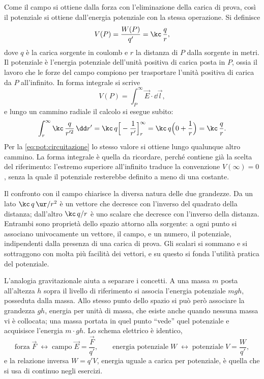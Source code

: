 \documentclass[main.tex]{subfiles}
\begin{document}
	Come il campo si ottiene dalla forza con l'eliminazione della carica di prova, così il potenziale si ottiene dall'energia potenziale con la stessa operazione. Si definisce
	\begin{equation}\label{eq:pot:Vpuntiforme}
		V(P)=\frac{W(P)}{q'}=\kc\,\frac{q}{r},
	\end{equation}
	dove $q$ è la carica sorgente in coulomb e $r$ la distanza di $P$ dalla sorgente in metri. Il potenziale è l'energia potenziale dell'unità positiva di carica posta in $P$, ossia il lavoro che le forze del campo compiono per trasportare l'unità positiva di carica da $P$ all'infinito. In forma integrale si scrive
	\[
	V(P)=\int_P^{\infty}\vec E\cdot\dd\vec l ,
	\]
	e lungo un cammino radiale il calcolo si esegue subito:
	\[
	\int_r^\infty\kc\,\frac{q}{r'^2}\,\dd r'=\kc\,q\Big[-\frac1{r'}\Big]_r^\infty=\kc\,q\Big(0+\frac1r\Big)=\kc\,\frac{q}{r}.
	\]
	Per la \eqref{eq:pot:circuitazione} lo stesso valore si ottiene lungo qualunque altro cammino. La forma integrale è quella da ricordare, perché contiene già la scelta del riferimento: l'estremo superiore all'infinito traduce la convenzione $V(\infty)=0$, senza la quale il potenziale resterebbe definito a meno di una costante.
	
	Il confronto con il campo chiarisce la diversa natura delle due grandezze. Da un lato $\kc\,q\,\ur/r^2$ è un vettore che decresce con l'inverso del quadrato della distanza; dall'altro $\kc\,q/r$ è uno scalare che decresce con l'inverso della distanza. Entrambi sono proprietà dello spazio attorno alla sorgente: a ogni punto si associano univocamente un vettore, il campo, e un numero, il potenziale, indipendenti dalla presenza di una carica di prova. Gli scalari si sommano e si sottraggono con molta più facilità dei vettori, e su questo si fonda l'utilità pratica del potenziale.
	
	L'analogia gravitazionale aiuta a separare i concetti. A una massa $m$ posta all'altezza $h$ sopra il livello di riferimento si associa l'energia potenziale $mgh$, posseduta dalla massa. Allo stesso punto dello spazio si può però associare la grandezza $gh$, energia per unità di massa, che esiste anche quando nessuna massa vi è collocata; una massa portata in quel punto \enquote{vede} quel potenziale e acquisisce l'energia $m\cdot gh$. Lo schema elettrico è identico,
	\[
	\text{forza}\;\vec F\;\longleftrightarrow\;\text{campo}\;\vec E=\frac{\vec F}{q'},\qquad
	\text{energia potenziale}\;W\;\longleftrightarrow\;\text{potenziale}\;V=\frac{W}{q'},
	\]
	e la relazione inversa $W=q'V$, energia uguale a carica per potenziale, è quella che si usa di continuo negli esercizi.
	
\end{document}
